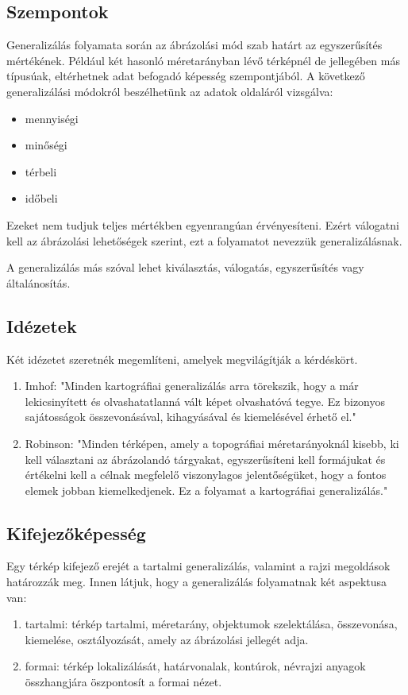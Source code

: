 		\subsection{Szempontok}
		Generalizálás folyamata során az ábrázolási mód szab határt az egyszerűsítés mértékének. Például két hasonló méretarányban lévő térképnél
		de jellegében más típusúak, eltérhetnek adat befogadó képesség szempontjából. A következő generalizálási módokról
		beszélhetünk az adatok oldaláról vizsgálva:
		\begin{itemize}
			\item mennyiségi
			\item minőségi
			\item térbeli
			\item időbeli
		\end{itemize}
		Ezeket nem tudjuk teljes mértékben egyenrangúan érvényesíteni. Ezért válogatni kell az ábrázolási lehetőségek szerint,
		ezt a folyamatot nevezzük generalizálásnak.
		
		
		A generalizálás más szóval lehet kiválasztás, válogatás, egyszerűsítés vagy általánosítás.
		
		\subsection{Idézetek}
		Két idézetet szeretnék megemlíteni, amelyek megvilágítják a kérdéskört.
		\begin{enumerate}
			\item Imhof: "Minden kartográfiai generalizálás arra törekszik, hogy a már lekicsinyített és olvashatatlanná
			vált képet olvashatóvá tegye. Ez bizonyos sajátosságok összevonásával, kihagyásával és kiemelésével
			érhető el."
			\item Robinson: "Minden térképen, amely a topográfiai méretarányoknál kisebb, ki kell választani az ábrázolandó
			tárgyakat, egyszerűsíteni kell formájukat és értékelni kell a célnak megfelelő viszonylagos jelentőségüket, hogy 
			a fontos elemek jobban kiemelkedjenek. Ez a folyamat a kartográfiai generalizálás."
		\end{enumerate}
		
		\subsection{Kifejezőképesség}
		Egy térkép kifejező erejét a tartalmi generalizálás, valamint a rajzi megoldások határozzák meg.  Innen látjuk, hogy 
		a generalizálás folyamatnak két aspektusa van:
		\begin{enumerate}
			\item tartalmi: térkép tartalmi, méretarány, objektumok szelektálása, összevonása, kiemelése, osztályozását, amely
			az ábrázolási jellegét adja.
			\item formai: térkép lokalizálását, határvonalak, kontúrok, névrajzi anyagok összhangjára öszpontosít a formai nézet.
		\end{enumerate}
		
